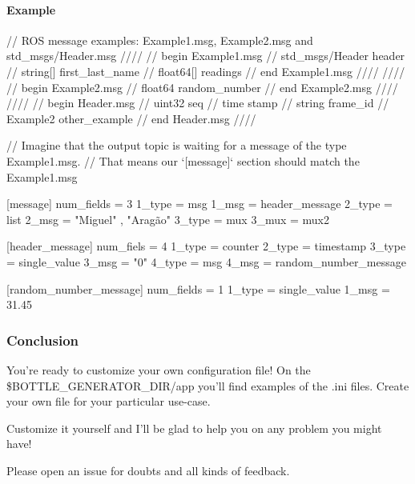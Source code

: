 \paragraph*{Example}

\begin{DoxyVerb}// ROS message examples: Example1.msg, Example2.msg and std_msgs/Header.msg 
//// 
// begin Example1.msg
//  std_msgs/Header header
//  string[] first_last_name
//  float64[] readings
// end Example1.msg
////
////
// begin Example2.msg
//  float64 random_number
// end Example2.msg
////
////
// begin Header.msg
//  uint32 seq
//  time stamp
//  string frame_id
//  Example2 other_example
// end Header.msg
////

// Imagine that the output topic is waiting for a message of the type Example1.msg.
// That means our `[message]` section should match the Example1.msg

[message]
num_fields = 3
1_type = msg
1_msg = header_message
2_type = list
2_msg = "Miguel" , "Aragão"
3_type = mux
3_mux = mux2

[header_message]
num_fiels = 4
1_type = counter
2_type = timestamp
3_type = single_value
3_msg = "0"
4_type = msg
4_msg = random_number_message

[random_number_message]
num_fields = 1
1_type = single_value
1_msg = 31.45
\end{DoxyVerb}


\subsubsection*{Conclusion}

You're ready to customize your own configuration file! On the {\ttfamily \$\-B\-O\-T\-T\-L\-E\-\_\-\-G\-E\-N\-E\-R\-A\-T\-O\-R\-\_\-\-D\-I\-R/app} you'll find examples of the {\ttfamily .ini} files. Create your own file for your particular use-\/case.

Customize it yourself and I'll be glad to help you on any problem you might have!

Please open an issue for doubts and all kinds of feedback. 
